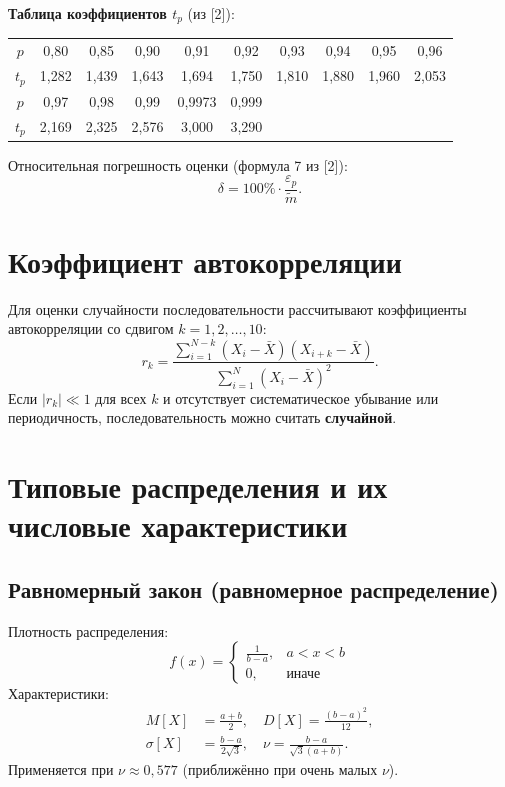 \documentclass[a4paper,12pt]{article}
\begin{document}
\textbf{Таблица коэффициентов $t_p$} (из [2]):
\begin{center}
\begin{tabular}{c|ccccccccc}
$p$ & 0,80 & 0,85 & 0,90 & 0,91 & 0,92 & 0,93 & 0,94 & 0,95 & 0,96 \\
$t_p$ & 1,282 & 1,439 & 1,643 & 1,694 & 1,750 & 1,810 & 1,880 & 1,960 & 2,053 \\
$p$ & 0,97 & 0,98 & 0,99 & 0,9973 & 0,999 \\
$t_p$ & 2,169 & 2,325 & 2,576 & 3,000 & 3,290
\end{tabular}
\end{center}

Относительная погрешность оценки (формула 7 из [2]):
\begin{equation}\label{eq:delta}
\delta = 100\% \cdot \frac{\varepsilon_p}{\tilde{m}}.
\end{equation}

\section{Коэффициент автокорреляции}
Для оценки случайности последовательности рассчитывают коэффициенты автокорреляции со сдвигом $k = 1, 2, \dots, 10$:
\begin{equation}\label{eq:ac}
r_k = \frac{\sum_{i=1}^{N-k}(X_i - \bar{X})(X_{i+k} - \bar{X})}{\sum_{i=1}^{N}(X_i - \bar{X})^2}.
\end{equation}
Если $|r_k| \ll 1$ для всех $k$ и отсутствует систематическое убывание или периодичность, последовательность можно считать \textbf{случайной}.

\section{Типовые распределения и их числовые характеристики}

\subsection{Равномерный закон (равномерное распределение)}
Плотность распределения:
\begin{equation}
f(x) = \begin{cases} \frac{1}{b-a}, & a < x < b \\ 0, & \text{иначе} \end{cases}
\end{equation}
Характеристики:
\begin{align}
M[X] &= \frac{a+b}{2}, \quad D[X] = \frac{(b-a)^2}{12}, \\
\sigma[X] &= \frac{b-a}{2\sqrt{3}}, \quad \nu = \frac{b-a}{\sqrt{3}(a+b)}.
\end{align}
Применяется при $\nu \approx 0{,}577$ (приближённо при очень малых $\nu$).
\end{document}
